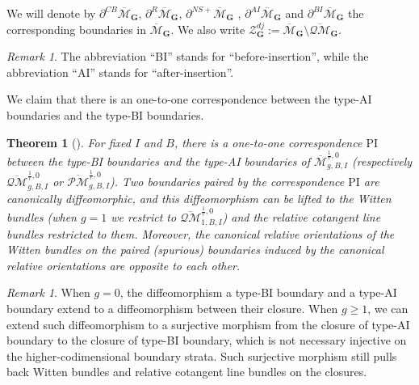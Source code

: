 \documentclass[11pt]{amsart}
\newtheorem{thm}[dummy]{Theorem}
\theoremstyle{definition}
\theoremstyle{remark}
\newtheorem{rmk}[dummy]{Remark}
\newcommand{\oPMb}{{\overline{\mathcal{PM}}}}
\newcommand{\oQMb}{{\overline{\mathcal{QM}}}}
\newcommand{\<}{\left<}
\renewcommand{\>}{\right>}
\numberwithin{equation}{section}
\def\Mbar{{\overline{\mathcal M}}}
\def\PI{{\text{PI}}}
\def\PI{\text{PI}}
\begin{document}
We will denote by $\partial^{CB} \Mbar_{\bm{G}}$, $\partial^{R} \Mbar_{\bm{G}}$, $\partial^{NS+} \Mbar_{\bm{G}}$%
, $\partial^{AI} \Mbar_{\bm{G}}$ and %
$\partial^{BI} \Mbar_{\bm{G}}$ the corresponding boundaries in $\Mbar_{\bm{G}}$. We also write $\mathcal Z^{dj}_{\bm{G}}:=\Mbar_{\bm{G}}\setminus \oQMb_{\bm{G}}$.
\begin{rmk}
    The abbreviation ``BI'' stands %
for ``before-insertion'', while %
the abbreviation ``AI'' stands %
for ``after-insertion''. 
\end{rmk}

We %
claim that there %
is an one-to-one %
correspondence between the type-AI boundaries and the type-BI boundaries.



    \begin{thm}[{\cite[Theorem 4.12]{TZ1}}]\label{thm  PI boundaries paried}
 For fixed $I$ and $B$, there is a one-to-one correspondence $\PI$ between the type-BI boundaries and the type-AI boundaries of $\Mbar^{\frac{1}{r},0}_{g,B,I}$ (respectively $\oQMb^{\frac{1}{r},0}_{g,B,I}$ or $\oPMb^{\frac{1}{r},0}_{g,B,I}$). Two boundaries paired by the correspondence $\PI$ are canonically diffeomorphic, and this diffeomorphism can be lifted to the Witten bundles (when $g=1$ we restrict to $\oQMb^{\frac{1}{r},0}_{1,B,I}$) and the relative cotangent line bundles restricted to them. Moreover, the canonical relative orientations of the Witten bundles on the paired (spurious) boundaries induced by the canonical relative orientations are opposite to each other. 
 \end{thm}

 \begin{rmk}\label{rmk non injective in PI g>0}
     When $g=0$, the diffeomorphism a type-BI boundary and a type-AI boundary extend to a diffeomorphism between their closure. When $g\ge 1$, we can extend such diffeomorphism to a surjective morphism from the closure of type-AI boundary to the closure of type-BI boundary, which is %
not necessary injective %
on %
the higher-codimensional boundary %
strata. Such surjective morphism still pulls back Witten bundles and relative cotangent line bundles on the closures.
 \end{rmk}
\end{document}
